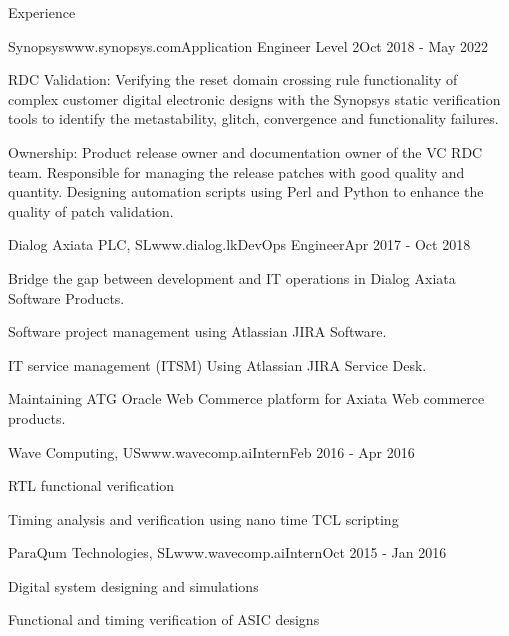 \documentclass[
11pt, %
]{./assets/resume} %
\begin{document}
\begin{rSection}{Experience}
\begin{rSubsectionX}{Synopsys}{www.synopsys.com}{Application Engineer Level 2}{Oct 2018 - May 2022}
		\item RDC Validation: Verifying the reset domain crossing rule functionality of complex customer digital electronic designs with the Synopsys static verification tools to identify the metastability, glitch, convergence and functionality failures. 
		\item Ownership: Product release owner and documentation owner of the VC RDC team. Responsible for managing the release patches with good quality and quantity. Designing automation scripts using Perl and Python to enhance the quality of patch validation.
	\end{rSubsectionX}
	\begin{rSubsectionX}{Dialog Axiata PLC, SL}{www.dialog.lk}{DevOps Engineer}{Apr 2017 - Oct 2018}
		\item Bridge the gap between development and IT operations in Dialog Axiata Software Products.
		\item Software project management using Atlassian JIRA Software.
		\item IT service management (ITSM) Using Atlassian JIRA Service Desk.
		\item Maintaining ATG Oracle Web Commerce platform for Axiata Web commerce products.
	\end{rSubsectionX}
	\begin{rSubsectionX}{Wave Computing, US}{www.wavecomp.ai}{Intern}{Feb 2016 - Apr 2016}
		\item RTL functional verification
		\item Timing analysis and verification using nano time TCL scripting
	\end{rSubsectionX}
	\begin{rSubsectionX}{ParaQum Technologies, SL}{www.wavecomp.ai}{Intern}{Oct 2015 - Jan 2016}
		\item Digital system designing and simulations
		\item Functional and timing verification of ASIC designs
	\end{rSubsectionX}

\end{rSection}

\end{document}
